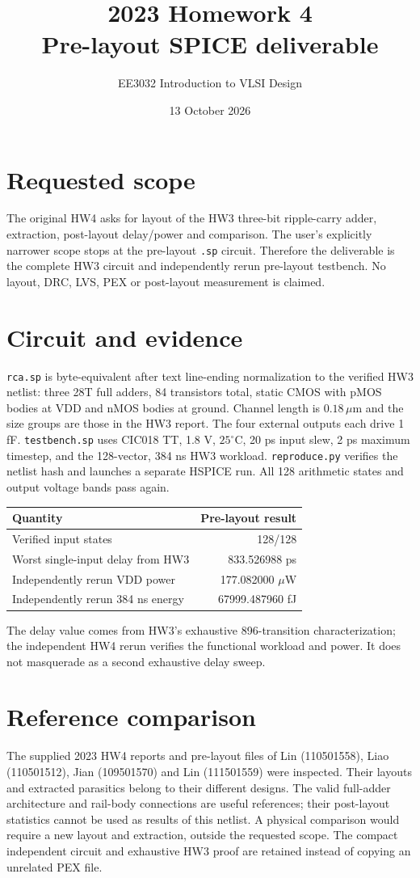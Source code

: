 \documentclass[10pt,a4paper]{article}
\title{2023 Homework 4\\Pre-layout SPICE deliverable}
\author{EE3032 Introduction to VLSI Design}\date{13 October 2026}
\begin{document}
\maketitle
\section*{Requested scope}
The original HW4 asks for layout of the HW3 three-bit ripple-carry adder,
extraction, post-layout delay/power and comparison. The user's explicitly
narrower scope stops at the pre-layout \texttt{.sp} circuit. Therefore the
deliverable is the complete HW3 circuit and independently rerun pre-layout
testbench. No layout, DRC, LVS, PEX or post-layout measurement is claimed.
\section*{Circuit and evidence}
\texttt{rca.sp} is byte-equivalent after text line-ending normalization to
the verified HW3 netlist: three 28T full adders, 84 transistors total,
static CMOS with pMOS bodies at VDD and nMOS bodies at ground.
Channel length is $0.18\,\mu$m and the size groups are those in the HW3
report. The four external outputs each drive 1 fF.
\texttt{testbench.sp} uses CIC018 TT, 1.8 V, $25^\circ$C, 20 ps input slew,
2 ps maximum timestep, and the 128-vector, 384 ns HW3 workload.
\texttt{reproduce.py} verifies the netlist hash and launches a separate HSPICE
run. All 128 arithmetic states and output voltage bands pass again.
\begin{center}\begin{tabular}{lr}
\toprule Quantity&Pre-layout result\\\midrule
Verified input states&128/128\\
Worst single-input delay from HW3&833.526988 ps\\
Independently rerun VDD power&177.082000 $\mu$W\\
Independently rerun 384 ns energy&67999.487960 fJ\\\bottomrule
\end{tabular}\end{center}
The delay value comes from HW3's exhaustive 896-transition characterization;
the independent HW4 rerun verifies the functional workload and power.
It does not masquerade as a second exhaustive delay sweep.
\section*{Reference comparison}
The supplied 2023 HW4 reports and pre-layout files of Lin (110501558),
Liao (110501512), Jian (109501570) and Lin (111501559) were inspected.
Their layouts and extracted parasitics belong to their different designs.
The valid full-adder architecture and rail-body connections are useful
references; their post-layout statistics cannot be used as results of this
netlist. A physical comparison would require a new layout and extraction,
outside the requested scope. The compact independent circuit and exhaustive
HW3 proof are retained instead of copying an unrelated PEX file.
\end{document}
